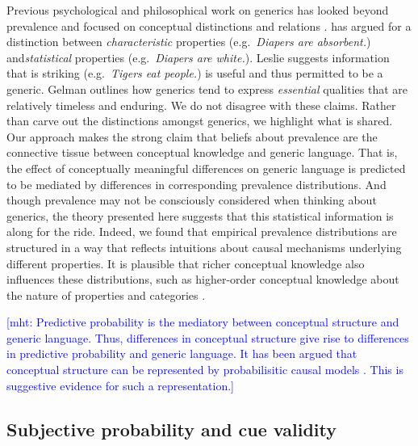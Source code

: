 \documentclass[12pt,letterpaper]{article}
\newcommand{\mht}[1]{\textcolor{Blue}{[mht: #1]}}
\begin{document}
Previous psychological and philosophical work on generics has looked beyond prevalence and focused on conceptual distinctions and relations \cite{Gelman2003,Prasada2013,Leslie2007,Leslie2008}. 
\citeauthor{Prasada2013} has argued for a distinction between \emph{characteristic} properties (e.g.~\emph{Diapers are absorbent.}) and\emph{statistical} properties (e.g.~\emph{Diapers are white.}).
Leslie suggests information that is striking (e.g.~\emph{Tigers eat people.}) is useful and thus permitted to be a generic.
Gelman outlines how generics tend to express \emph{essential} qualities that are relatively timeless and enduring. 
We do not disagree with these claims. 
Rather than carve out the distinctions amongst generics, we highlight what is shared. 
Our approach makes the strong claim that beliefs about prevalence are the connective tissue between conceptual knowledge and generic language.
That is, the effect of conceptually meaningful differences on generic language is predicted to be mediated by differences in corresponding prevalence distributions.
And though prevalence may not be consciously considered when thinking about generics, the theory presented here suggests that this statistical information is along for the ride. 
Indeed, we found that empirical prevalence distributions are structured in a way that reflects intuitions about causal mechanisms underlying different properties.
It is plausible that richer conceptual knowledge also influences these distributions, such as higher-order conceptual knowledge about the nature of properties and categories \cite{Gelman2003,Keil1992}. 


\mht{Predictive probability is the mediatory between conceptual structure and generic language. Thus, differences in conceptual structure give rise to differences in predictive probability and generic language. It has been argued that conceptual structure can be represented by probabilisitic causal models \cite{Pearl, Gopnik, Goodman2015}. This is suggestive evidence for such a representation.}

\subsection*{Subjective probability and cue validity}
\end{document}
